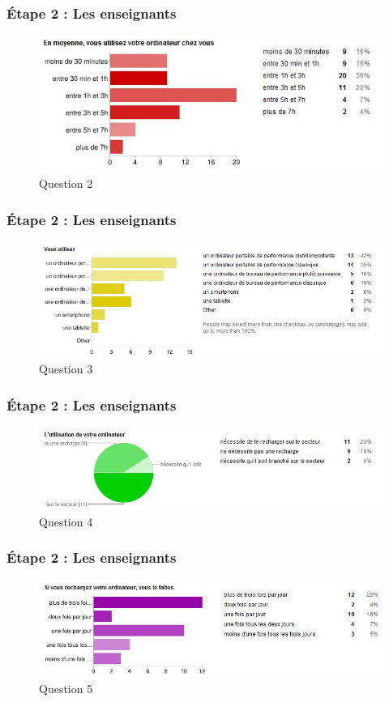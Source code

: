 \documentclass[slidetop,11pt]{beamer}
\begin{document}
\begin{frame} 
  \frametitle{\'Etape 2 : Les enseignants}
  \begin{figure}[h!]
  \includegraphics[width=\textwidth]{i7.JPG}
  \caption{Question 2}
  \label{i2}
  \end{figure}
\end{frame}

\begin{frame} 
  \frametitle{\'Etape 2 : Les enseignants}
  \begin{figure}[h!]
  \includegraphics[width=\textwidth]{i8.JPG}
  \caption{Question 3}
  \label{i3}
  \end{figure}
\end{frame}

\begin{frame} 
  \frametitle{\'Etape 2 : Les enseignants}
  \begin{figure}[h!]
  \includegraphics[width=\textwidth]{i9.JPG}
  \caption{Question 4}
  \label{i4}
  \end{figure}
\end{frame}

\begin{frame} 
  \frametitle{\'Etape 2 : Les enseignants}
  \begin{figure}[h!]
  \includegraphics[width=\textwidth]{i10.JPG}
  \caption{Question 5}
  \label{i5}
  \end{figure}
\end{frame}
\end{document}
